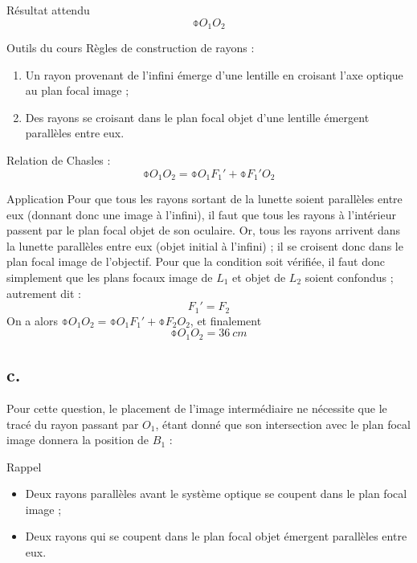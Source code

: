 \documentclass[../main/main.tex]{subfiles}
\begin{document}
\begin{tcbraster}[raster columns=6, raster equal height=rows]
    \begin{NCprop}[raster multicolumn=1]{Résultat attendu}
        $$\obar{O_1O_2}$$
    \end{NCprop}
    \begin{NCdemo}[raster multicolumn=2]{Outils du cours}
        Règles de construction de rayons :
        \begin{enumerate}
            \item Un rayon provenant de l'infini émerge d'une lentille en croisant
                l'axe optique au plan focal image ;
            \item Des rayons se croisant dans le plan focal objet d'une lentille
                émergent parallèles entre eux.
        \end{enumerate}
        Relation de Chasles :
        \[ \obar{O_1O_2} = \obar{O_1F_1'} + \obar{F_1'O_2} \]
    \end{NCdemo}
    \begin{NCexem}[raster multicolumn=3]{Application}
        Pour que tous les rayons sortant de la lunette soient parallèles entre eux
        (donnant donc une image à l'infini), il faut que tous les rayons à
        l'intérieur passent par le plan focal objet de son oculaire.\bigbreak
        Or, tous les rayons arrivent dans la lunette parallèles entre eux (objet
        initial à l'infini) ; il se croisent donc dans le plan focal image de
        l'objectif. \bigbreak
        Pour que la condition soit vérifiée, il faut donc simplement que les plans
        focaux image de $L_1$ et objet de $L_2$ soient confondus ; autrement dit :
        \[ \boxed{F_1' = F_2} \]
        On a alors $\obar{O_1O_2} = \obar{O_1F_1'} + \obar{F_2O_2}$, et finalement
        \[ \boxed{\obar{O_1O_2} = \SI{+36}{cm}} \]
    \end{NCexem}
\end{tcbraster}

\setcounter{subsection}{1}
\subsection{c.}
Pour cette question, le placement de l'image intermédiaire ne nécessite que le
tracé du rayon passant par $O_1$, étant donné que son intersection avec le plan
focal image donnera la position de $B_1$ :

\begin{center}
    \begin{NCrapp}[width=.7\linewidth]{Rappel}
        \begin{itemize}
            \item Deux rayons parallèles avant le système optique se coupent
                dans le plan focal image ;
            \item Deux rayons qui se coupent dans le plan focal objet émergent
                parallèles entre eux.
        \end{itemize}
    \end{NCrapp}
\end{center}
\end{document}
